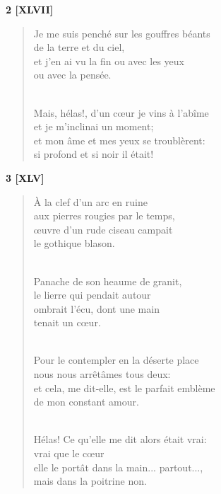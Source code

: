 \documentclass[a4paper,12pt]{book}
\begin{document}
\bigskip

\begin{center} {\bf 2 [XLVII]} \end{center}

\begin{verse}
Je me suis penché sur les gouffres béants\\
de la terre et du ciel, \\
et j'en ai vu la fin ou avec les yeux \\
ou avec la pensée. \\ \

Mais, hélas!, d'un c{\oe}ur je vins à l'abîme \\
et je m'inclinai un moment; \\
et mon âme et mes yeux se troublèrent: \\
si profond et si noir il était! \\
\end{verse}

\bigskip

\begin{center} {\bf 3 [XLV]} \end{center}

\begin{verse}
À la clef d'un arc en ruine \\
aux pierres rougies par le temps, \\
{\oe}uvre d'un rude ciseau campait \\
le gothique blason. \\ \

Panache de son heaume de granit, \\
le lierre qui pendait autour \\
ombrait l'écu, dont une main \\
tenait un c{\oe}ur. \\ \


Pour le contempler en la déserte place \\
nous nous arrêtâmes tous deux: \\
et cela, me dit-elle, est le parfait emblème \\
de mon constant amour. \\ \

Hélas! Ce qu'elle me dit alors était vrai: \\
vrai que le c{\oe}ur \\
elle le portât dans la main... partout..., \\
mais dans la poitrine non. \\
\end{verse}
\end{document}
